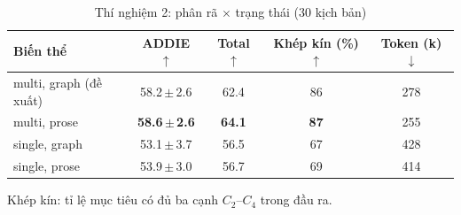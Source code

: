 \begin{table}[t]
  \caption{Thí nghiệm 2: phân rã $\times$ trạng thái (30 kịch bản)}
  \label{tab:ablation}
  \centering
  \footnotesize
  \setlength{\tabcolsep}{3pt}
  \begin{tabular}{@{}lcccc@{}}
    \toprule
    Biến thể & ADDIE $\uparrow$ & Total $\uparrow$ & Khép kín (\%) $\uparrow$ & Token (k) $\downarrow$ \\
    \midrule
    multi, graph (đề xuất) & 58.2\,$\pm$\,2.6 & 62.4 & 86 & 278 \\
    multi, prose & \textbf{58.6\,$\pm$\,2.6} & \textbf{64.1} & \textbf{87} & 255 \\
    single, graph & 53.1\,$\pm$\,3.7 & 56.5 & 67 & 428 \\
    single, prose & 53.9\,$\pm$\,3.0 & 56.7 & 69 & 414 \\
    \bottomrule
  \end{tabular}
  \par\vspace{2pt}
  {\scriptsize\raggedright Khép kín: tỉ lệ mục tiêu có đủ ba cạnh $C_2$--$C_4$ trong đầu ra.\par}
\end{table}
